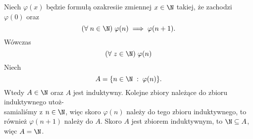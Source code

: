\documentclass{article}
\begin{document}
Niech $\varphi(x)$ będzie formułą ozakresiie zmiennej $x\in\N$ takiej, że zachodzi $\varphi(0)$ oraz
$$(\forall\;n\in\N)\;\varphi(n)\implies\varphi(n+1).$$
Wówczas 
$$(\forall\;z\in\N)\;\varphi(n)$$
\dowod
Niech 
$$A=\{n\in\N\;:\;\varphi(n)\}.$$
Wtedy $A\in\N$ oraz $A$ jest induktywny. Kolejne zbiory należące do zbioru induktywnego utoż-\\samialiśmy z $n\in\N$, więc skoro $\varphi(n)$ należy do tego zbioru induktywnego, to również $\varphi(n+1)$ należy do $A$. Skoro $A$ jest zbiorem induktywnym, to $\N\subseteq A$, więc $A=\N$.
\kondow
\end{document}
